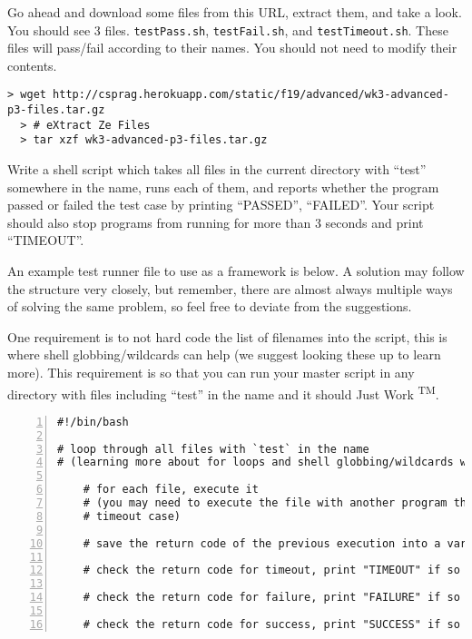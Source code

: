 \documentclass{article}
\begin{document}
\noindent
Go ahead and download some files from this URL, extract them, and take a look.
You should see 3 files. \texttt{testPass.sh}, \texttt{testFail.sh}, and
\texttt{testTimeout.sh}. These files will pass/fail according to their names.
You should not need to modify their contents.

\begin{Verbatim}[fontsize=\footnotesize]
  > wget http://csprag.herokuapp.com/static/f19/advanced/wk3-advanced-p3-files.tar.gz
  > # eXtract Ze Files
  > tar xzf wk3-advanced-p3-files.tar.gz
\end{Verbatim}

\noindent
Write a shell script which takes all files in the current directory with
``test'' somewhere in the name, runs each of them, and reports whether the
program passed or failed the test case by printing ``PASSED'', ``FAILED''. Your
script should also stop programs from running for more than 3 seconds and
print ``TIMEOUT''.

An example test runner file to use as a framework is below. A solution may follow the
structure very closely, but remember, there are almost always multiple ways of
solving the same problem, so feel free to deviate from the suggestions.

One requirement is to not hard code the list of filenames into the script, this
is where shell globbing/wildcards can help (we suggest looking these up to learn
more). This requirement is so that you can run your master script in any
directory with files including ``test'' in the name and it should
Just Work \textsuperscript{TM}.


\begin{minipage}[t]{0.5\textwidth}
\begin{lstlisting}[numbers=left]
#!/bin/bash

# loop through all files with `test` in the name
# (learning more about for loops and shell globbing/wildcards will help for this)

    # for each file, execute it
    # (you may need to execute the file with another program that will handle the
    # timeout case)

    # save the return code of the previous execution into a variable

    # check the return code for timeout, print "TIMEOUT" if so

    # check the return code for failure, print "FAILURE" if so

    # check the return code for success, print "SUCCESS" if so

\end{lstlisting}
\end{minipage}
\end{document}
